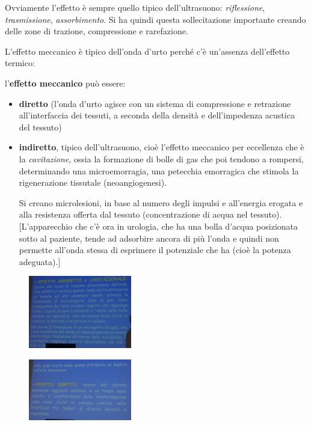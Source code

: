 Ovviamente l'effetto è sempre quello tipico dell'ultrasuono:
\emph{riflessione}, \emph{trasmissione}, \emph{assorbimento}. Si ha
quindi questa sollecitazione importante creando delle zone di trazione,
compressione e rarefazione.

L'effetto meccanico è tipico dell'onda d'urto perché c'è un'assenza
dell'effetto termico:

l'\textbf{effetto meccanico} può essere:

\begin{itemize}
\item
  \textbf{diretto} (l'onda d'urto agisce con un sistema di compressione
  e retrazione all'interfaccia dei tessuti, a seconda della densità e
  dell'impedenza acustica del tessuto)
\item
  \textbf{indiretto}, tipico dell'ultrasuono, cioè l'effetto meccanico
  per eccellenza che è la \emph{cavitazione}, ossia la formazione di
  bolle di gas che poi tendono a rompersi, determinando una
  microemorragia, una petecchia emorragica che stimola la rigenerazione
  tissutale (neoangiogenesi).

Si creano microlesioni, in base al numero degli impulsi e all'energia
erogata e alla resistenza offerta dal tessuto (concentrazione di acqua
nel tessuto). {[}L'apparecchio che c'è ora in urologia, che ha una bolla
d'acqua posizionata sotto al paziente, tende ad adsorbire ancora di più
l'onda e quindi non permette all'onda stessa di esprimere il potenziale
che ha (cioè la potenza adeguata).{]}
\end{itemize}

\begin{figure}[!ht]
\centering
\includegraphics[width=0.4\textwidth]{025/image11.jpeg}
\end{figure}

\begin{figure}[!ht]
\centering
\includegraphics[width=0.4\textwidth]{025/image12.jpeg}
\end{figure}

